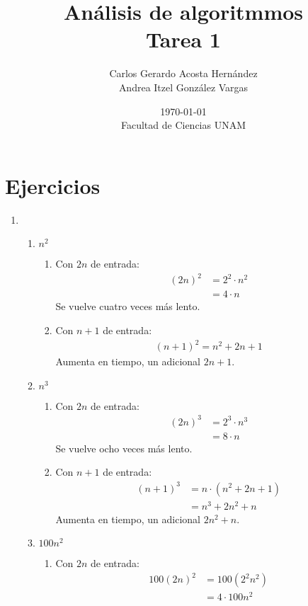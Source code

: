 \documentclass[12pt]{article}
\title{Análisis de algoritmmos \\ Tarea 1}
\author{Carlos Gerardo Acosta Hernández \\ Andrea Itzel González Vargas}
\date{\today \\ Facultad de Ciencias UNAM}
\newenvironment{boenumerate}
               {\begin{enumerate}\renewcommand\labelenumi{\textbf{\theenumi.}}}
               {\end{enumerate}}
\begin{document}
\maketitle

\section*{Ejercicios}

\begin{boenumerate}
\item 
  \begin{enumerate}
  \item $n^2$
    \begin{enumerate}
    \item Con $2n$ de entrada:
      \begin{align}
        (2n)^2 & = 2^2 \cdot n^2 \\ & = 4 \cdot n
      \end{align}
      Se vuelve cuatro veces más lento.
    \item Con $n+1$ de entrada:
      \begin{align}
        (n+1)^2 = n^2+2n+1
      \end{align}
      Aumenta en tiempo, un adicional $2n+1$.
    \end{enumerate}
  \item $n^3$
    \begin{enumerate}
    \item Con $2n$ de entrada:
      \begin{align}
        (2n)^3 & = 2^3 \cdot n^3 \\ & = 8 \cdot n
      \end{align}
      Se vuelve ocho veces más lento.
    \item Con $n+1$ de entrada:
      \begin{align}
        (n+1)^3 &= n\cdot(n^2+2n+1) \\
        &= n^3+2n^2+n
      \end{align}
      Aumenta en tiempo, un adicional $2n^2+n$.
    \end{enumerate}
  \item $100n^2$
    \begin{enumerate}
    \item Con $2n$ de entrada:
      \begin{align}
        100(2n)^2 &= 100(2^2n^2) \\
        &= 4 \cdot 100n^2 
      \end{align}

\end{enumerate}
\end{enumerate}
\end{boenumerate}
\end{document}
